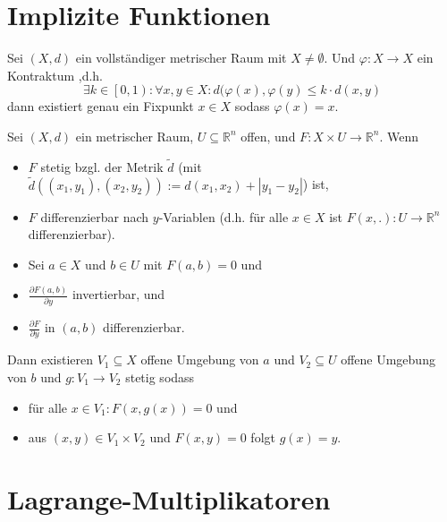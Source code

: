 \documentclass[]{scrartcl}
\newcommand{\R}{\ensuremath{\mathbb{R}}}
\begin{document}
\section*{Implizite Funktionen}

\begin{satz}
Sei $(X,d)$ ein vollst\"andiger metrischer Raum mit $X\neq\emptyset$. Und $\varphi\colon X\to X$ ein Kontraktum ,d.h. \[\exists k\in\left[0,1\right)\colon\forall x,y\in X\colon  d(\varphi(x),\varphi(y)\leq k\cdot d(x,y)\]
dann existiert genau ein Fixpunkt $x\in X$ sodass $\varphi(x)=x$.
\end{satz}

\begin{satz}[1. Auflösunssatz]
Sei $(X,d)$ ein metrischer Raum, $U\subseteq\R^n$ offen, und $F\colon X\times U\to\R^n$.
Wenn
\begin{itemize}
\item $F$ stetig bzgl. der Metrik $\tilde{d}$ (mit $\tilde{d}((x_1,y_1),(x_2,y_2)):=d(x_1,x_2)+|y_1-y_2|$) ist,
\item $F$ differenzierbar nach $y$-Variablen (d.h. f\"ur alle $x\in X$ ist $F(x,.)\colon U\to\R^n$ differenzierbar).
\item Sei $a\in X$ und $b\in U$ mit $F(a,b)=0$ und
\item $\frac{\partial F(a,b)}{\partial y}$ invertierbar, und
\item $\frac{\partial F}{\partial y}$ in $(a,b)$ differenzierbar.
\end{itemize} 

Dann existieren $V_1\subseteq X$ offene Umgebung von $a$ und $V_2\subseteq U$ offene Umgebung von $b$ und $g\colon V_1\to V_2$ stetig sodass
\begin{itemize}
\item f\"ur alle $x\in V_1\colon F(x,g(x))=0$ und
\item aus $(x,y)\in V_1\times V_2$ und $F(x,y)=0$ folgt $g(x)=y$.
\end{itemize}
\end{satz}

\section*{Lagrange-Multiplikatoren}
\end{document}
